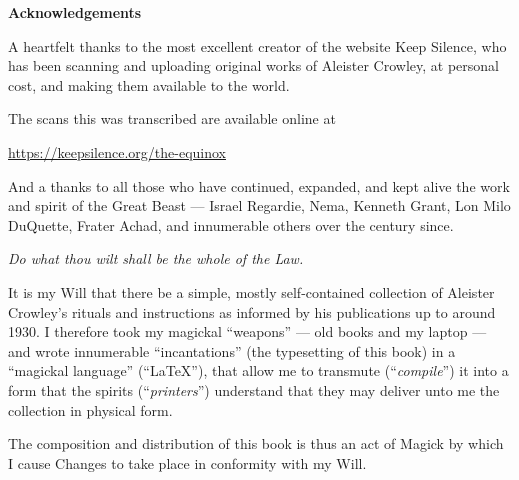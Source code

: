 {
\vspace*{\fill}
\begin{center}
\huge
\textbf{Acknowledgements}
\end{center}

A heartfelt thanks to the most excellent creator of the website Keep Silence, who has been scanning and uploading original works of Aleister Crowley, at personal cost, and making them available to the world.

The scans this was transcribed are available online at

\begin{center}
\url{https://keepsilence.org/the-equinox}
\end{center}

And a thanks to all those who have continued, expanded, and kept alive the work and spirit of the Great Beast --- Israel Regardie, Nema, Kenneth Grant, Lon Milo DuQuette, Frater Achad, and innumerable others over the century since.

\vspace*{\fill}
}


\textit{Do what thou wilt shall be the whole of the Law.}


It is my Will that there be a simple, mostly self-contained collection of Aleister Crowley's rituals and instructions as informed by his publications up to around 1930. I therefore took my magickal \enquote{weapons} --- old books and my laptop --- and wrote innumerable \enquote{incantations} (the typesetting of this book) in a \enquote{magickal language} (\enquote{\LaTeX}), that allow me to transmute (\enquote{\textit{compile}}) it into a form that the spirits (\enquote{\textit{printers}}) understand that they may deliver unto me the collection in physical form.

The composition and distribution of this book is thus an act of Magick by which I cause Changes to take place in conformity with my Will.

